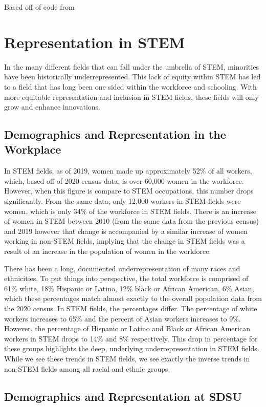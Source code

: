 \documentclass{article}
\begin{document}
Based off of code from \cite{kantor2024}

\section{Representation in STEM}
In the many different fields that can fall under the umbrella of STEM, minorities have been historically underrepresented. This lack of equity within STEM has led to a field that has long been one sided within the workforce and schooling. With more equitable representation and inclusion in STEM fields, these fields will only grow and enhance innovations.

\subsection{Demographics and Representation in the Workplace}

In STEM fields, as of 2019, women made up approximately 52\% of all workers, which, based off of 2020 census data, is over 60,000 women in the workforce. However, when this figure is compare to STEM occupations, this number drops significantly. From the same data, only 12,000 workers in STEM fields were women, which is only 34\% of the workforce in STEM fields. There is an increase of women in STEM between 2010 (from the same data from the previous census) and 2019 however that change is accompanied by a similar increase of women working in non-STEM fields, implying that the change in STEM fields was a result of an increase in the population of women in the workforce.\cite{stem2023}\cite{census2020}

There has been a long, documented underrepresentation of many races and ethnicities. To put things into perspective, the total workforce is comprised of 61\% white, 18\% Hispanic or Latino, 12\% black or African American, 6\% Asian, which these percentages match almost exactly to the overall population data from the 2020 census. In STEM fields, the percentages differ. The percentage of white workers increases to 65\% and the percent of Asian workers increases to 9\%. However, the percentage of Hispanic or Latino and Black or African American workers in STEM drops to 14\% and 8\% respectively. This drop in percentage for these groups highlights the deep, underlying underrepresentation in STEM fields. While we see these trends in STEM fields, we see exactly the inverse  trends in non-STEM fields among all racial and ethnic groups.\cite{stem2023}\cite{census2020}
\subsection{Demographics and Representation at SDSU}
\end{document}
